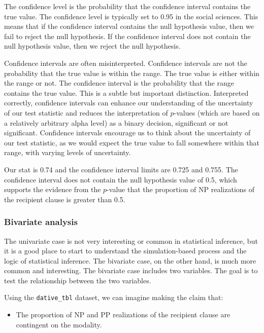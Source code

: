 \documentclass[
  letterpaper,
  krantz1]{latex/krantz-mod}
\providecommand{\tightlist}{%
  \setlength{\itemsep}{0pt}\setlength{\parskip}{0pt}}\usepackage{longtable,booktabs,array}
\theoremstyle{definition}
\theoremstyle{definition}
\theoremstyle{remark}
\begin{document}
The confidence level is the probability that the confidence interval
contains the true value. The confidence level is typically set to 0.95
in the social sciences. This means that if the confidence interval
contains the null hypothesis value, then we fail to reject the null
hypothesis. If the confidence interval does not contain the null
hypothesis value, then we reject the null hypothesis.

Confidence intervals are often
misinterpreted. Confidence intervals are not the probability that the
true value is within the range. The true value is either within the
range or not. The confidence interval is the probability that the range
contains the true value. This is a subtle but important distinction.
Interpreted correctly, confidence intervals can enhance our
understanding of the uncertainty of our test statistic and reduces the
interpretation of \(p\)-values (which are based on a
relatively arbitrary alpha level) as a binary
decision, significant or not significant. Confidence intervals encourage
us to think about the uncertainty of our test statistic, as we would
expect the true value to fall somewhere within that range, with varying
levels of uncertainty.

Our stat is 0.74 and the confidence interval limits are 0.725 and 0.755.
The confidence interval does not contain the null
hypothesis value of 0.5, which supports the
evidence from the \(p\)-value that the proportion of NP realizations of
the recipient clause is greater than 0.5.

\subsubsection{Bivariate analysis}\label{sec-infer-cat-bivariate}

The univariate case is not very interesting or common in statistical
inference, but it is a good place to start to understand the
simulation-based process and the logic of statistical inference. The
bivariate case, on the other hand, is much more common and interesting.
The bivariate case includes two variables. The goal is to test the
relationship between the two variables.

Using the \texttt{dative\_tbl} dataset, we can imagine making the claim
that:

\begin{itemize}
\tightlist
\item
  The proportion of NP and PP realizations of the recipient clause are
  contingent on the modality.
\end{itemize}
\end{document}
